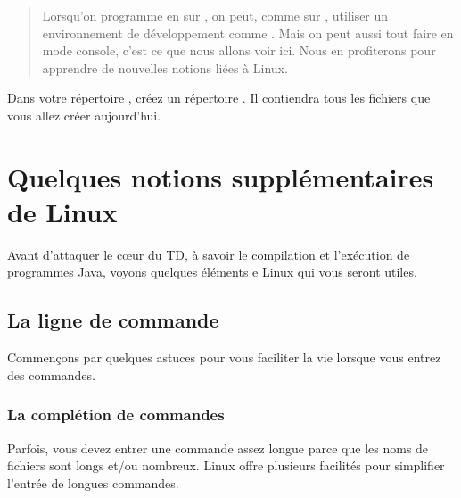 \documentclass[a4paper,11pt]{style-esi/td}
\begin{document}
\entete
\titre
{}
\lastedit

\bigskip
\begin{abstract}
    Lorsqu'on programme en  sur ,
    on peut, comme sur ,
    utiliser un environnement de développement comme .
    Mais on peut aussi tout faire en mode console, 
    c'est ce que nous allons voir ici.
    Nous en profiterons pour apprendre de nouvelles notions liées à Linux.
\end{abstract}

\bigskip
\tableofcontents

\vfill
\begin{infobox}
    Dans votre répertoire , 
    créez un répertoire . 
    Il contiendra tous les fichiers que vous allez créer aujourd'hui. 
\end{infobox}

\newpage

\section{Quelques notions supplémentaires de Linux}

	Avant d'attaquer le c\oe{}ur du TD, 
	à savoir le compilation et l'exécution de programmes Java,
	voyons quelques éléments e Linux qui vous seront utiles.

	\subsection{La ligne de commande}
              
		Commençons par quelques astuces 
		pour vous faciliter la vie lorsque vous entrez des commandes.
		
		\subsubsection*{La complétion de commandes}

			Parfois, vous devez entrer une commande assez longue 
			parce que les noms de fichiers sont longs et/ou nombreux.
			Linux offre plusieurs facilités pour simplifier l'entrée de longues commandes.  
\end{document}
